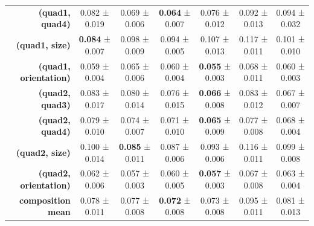 \begin{tabular}{rcccccc}
\textbf{(quad1, quad4)} & 0.082 ± 0.019 & 0.069 ± 0.006 & \textbf{0.064} ± 0.007 & 0.076 ± 0.012 & 0.092 ± 0.013 & 0.094 ± 0.032 \\
\textbf{(quad1, size)} & \textbf{0.084} ± 0.007 & 0.098 ± 0.009 & 0.094 ± 0.005 & 0.107 ± 0.013 & 0.117 ± 0.011 & 0.101 ± 0.010 \\
\textbf{(quad1, orientation)} & 0.059 ± 0.004 & 0.065 ± 0.006 & 0.060 ± 0.004 & \textbf{0.055} ± 0.003 & 0.068 ± 0.011 & 0.060 ± 0.003 \\
\textbf{(quad2, quad3)} & 0.083 ± 0.017 & 0.080 ± 0.014 & 0.076 ± 0.015 & \textbf{0.066} ± 0.008 & 0.083 ± 0.012 & 0.067 ± 0.007 \\
\textbf{(quad2, quad4)} & 0.079 ± 0.010 & 0.074 ± 0.007 & 0.071 ± 0.010 & \textbf{0.065} ± 0.009 & 0.077 ± 0.008 & 0.068 ± 0.004 \\
\textbf{(quad2, size)} & 0.100 ± 0.014 & \textbf{0.085} ± 0.011 & 0.087 ± 0.006 & 0.093 ± 0.006 & 0.116 ± 0.011 & 0.099 ± 0.008 \\
\textbf{(quad2, orientation)} & 0.062 ± 0.006 & 0.057 ± 0.003 & 0.060 ± 0.005 & \textbf{0.057} ± 0.003 & 0.067 ± 0.008 & 0.063 ± 0.004 \\
\addlinespace
\textbf{composition mean} & 0.078 ± 0.011 & 0.077 ± 0.008 & \textbf{0.072} ± 0.008 & 0.073 ± 0.008 & 0.095 ± 0.011 & 0.081 ± 0.013 \\
\midrule
\bottomrule
\end{tabular}